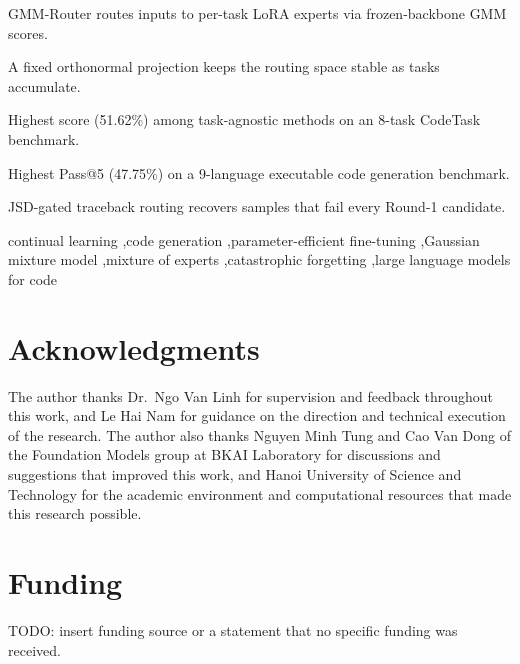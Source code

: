 \documentclass[a4paper,fleqn]{cas-dc}
\begin{document}
\begin{highlights}
\item GMM-Router routes inputs to per-task LoRA experts via frozen-backbone GMM scores.
\item A fixed orthonormal projection keeps the routing space stable as tasks accumulate.
\item Highest score (51.62\%) among task-agnostic methods on an 8-task CodeTask benchmark.
\item Highest Pass@5 (47.75\%) on a 9-language executable code generation benchmark.
\item JSD-gated traceback routing recovers samples that fail every Round-1 candidate.
\end{highlights}

\begin{keywords}
continual learning \sep code generation \sep parameter-efficient fine-tuning \sep Gaussian mixture model \sep mixture of experts \sep catastrophic forgetting \sep large language models for code
\end{keywords}

\maketitle










\section*{Acknowledgments}
The author thanks Dr.\ Ngo Van Linh for supervision and feedback throughout this work, and Le Hai Nam for guidance on the direction and technical execution of the research. The author also thanks Nguyen Minh Tung and Cao Van Dong of the Foundation Models group at BKAI Laboratory for discussions and suggestions that improved this work, and Hanoi University of Science and Technology for the academic environment and computational resources that made this research possible.

\section*{Funding}
TODO: insert funding source or a statement that no specific funding was received.
\end{document}
